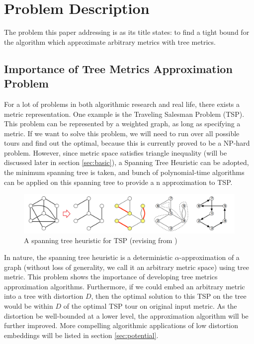 \documentclass[11pt,twoside, onecolumn]{IEEEtran}
\begin{document}
\section{Problem Description}
\label{sec:desc}
The problem this paper addressing is as its title states: to find a tight bound for the algorithm 
which approximate arbitrary metrics with tree metrics.
\subsection{Importance of Tree Metrics Approximation Problem}
For a lot of problems in both algorithmic research and real life, there exists a metric representation.
One example is the Traveling Salesman Problem (TSP). This problem can be represented by a weighted graph, as long as specifying a metric. If we want to solve this
problem, we will need to run over all possible tours and find out the optimal, because this is currently
proved to be a NP-hard problem. However, since metric space satisfies triangle inequality (will be
discussed later in section \ref{sec:basic}), a Spanning Tree Heuristic\cite{h_tsp} can be adopted,
the minimum spanning tree is taken, and bunch of polynomial-time algorithms can be applied on this spanning
tree to provide a n approximation to TSP.

\begin{figure}[hbt]
	\begin{center}
	\includegraphics[scale=0.4]{h_tsp.png}
	\end{center}
	\caption{A spanning tree heuristic for TSP (revising from \cite{Jeff})}
	\label{fig:tsp}
\end{figure}

In nature, the spanning tree heuristic is a deterministic $\alpha$-approximation of a graph (without
loss of generality, we call it an arbitrary metric space) using tree metric.
This problem shows the importance of developing tree metrics approximation algorithms. Furthermore, if we could
embed an arbitrary metric into a tree with distortion $D$, then the optimal solution to this TSP
on the tree would be within $D$ of the optimal TSP tour on original input metric. As the distortion
be well-bounded at a lower level, the approximation algorithm will be further improved. More compelling
algorithmic applications of low distortion embeddings will be listed in section \ref{sec:potential}.
\end{document}
